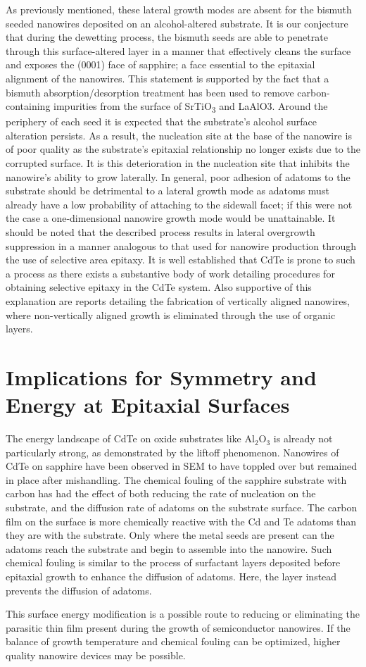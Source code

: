 As previously mentioned, these lateral growth modes are absent for the bismuth seeded nanowires deposited on an alcohol-altered substrate.
It is our conjecture that during the dewetting process, the bismuth seeds are able to penetrate through this surface-altered layer in a manner that effectively cleans the surface and exposes the (0001) face of sapphire; a face essential to the epitaxial alignment of the nanowires.
This statement is supported by the fact that a bismuth absorption/desorption treatment has been used to remove carbon-containing impurities from the surface of SrTiO\textsubscript{3} and LaAlO3\cite{Watanabe1991a}.
Around the periphery of each seed it is expected that the substrate's alcohol surface alteration persists.
As a result, the nucleation site at the base of the nanowire is of poor quality as the substrate's epitaxial relationship no longer exists due to the corrupted surface.
It is this deterioration in the nucleation site that inhibits the nanowire's ability to grow laterally.
In general, poor adhesion of adatoms to the substrate should be detrimental to a lateral growth mode as adatoms must already have a low probability of attaching to the sidewall facet; if this were not the case a one-dimensional nanowire growth mode would be unattainable.
It should be noted that the described process results in lateral overgrowth suppression in a manner analogous to that used for nanowire production through the use of selective area epitaxy.
It is well established that CdTe is prone to such a process as there exists a substantive body of work detailing procedures for obtaining selective epitaxy in the CdTe system\cite{Sporken2000,Zhang2001a,Bhat2006a}.
Also supportive of this explanation are reports detailing the fabrication of vertically aligned nanowires, where non-vertically aligned growth is eliminated through the use of organic layers\cite{Krishnamachari2004,Mikkelsen2005,Martensson2007}.

\section{Implications for Symmetry and Energy at Epitaxial Surfaces}
The energy landscape of CdTe on oxide substrates like Al\(_2\)O\(_3\) is already not particularly strong, as demonstrated by the liftoff phenomenon.
Nanowires of CdTe on sapphire have been observed in SEM to have toppled over but remained in place after mishandling.
The chemical fouling of the sapphire substrate with carbon has had the effect of both reducing the rate of nucleation on the substrate, and the diffusion rate of adatoms on the substrate surface.
The carbon film on the surface is more chemically reactive with the Cd and Te adatoms than they are with the substrate.
Only where the metal seeds are present can the adatoms reach the substrate and begin to assemble into the nanowire.
Such chemical fouling is similar to the process of surfactant layers deposited before epitaxial growth to enhance the diffusion of adatoms.
Here, the layer instead prevents the diffusion of adatoms.

This surface energy modification is a possible route to reducing or eliminating the parasitic thin film present during the growth of semiconductor nanowires.
If the balance of growth temperature and chemical fouling can be optimized, higher quality nanowire devices may be possible.

